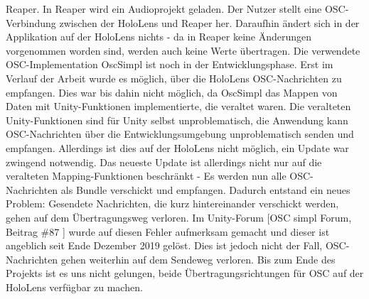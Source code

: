 \documentclass[11pt, titlepage, fleqn]{report}
\begin{document}
        	Reaper. In Reaper wird ein Audioprojekt geladen. Der Nutzer stellt 
        	eine OSC-Verbindung zwischen der HoloLens und Reaper her. Daraufhin 
        	ändert sich in der Applikation auf der HoloLens nichts - da in 
        	Reaper keine Änderungen vorgenommen worden sind, werden auch keine 
        	Werte übertragen.\newline
        	Die verwendete OSC-Implementation OscSimpl ist noch in der 
        	Entwicklungsphase. Erst im Verlauf der Arbeit wurde es möglich, 
        	über die HoloLens OSC-Nachrichten zu empfangen. Dies war bis dahin 
        	nicht möglich, da OscSimpl das Mappen von Daten mit 
        	Unity-Funktionen implementierte, die veraltet waren. Die veralteten 
        	Unity-Funktionen sind für Unity selbst unproblematisch, die 
        	Anwendung kann OSC-Nachrichten über die Entwicklungsumgebung 
        	unproblematisch senden und empfangen. Allerdings ist dies auf der 
        	HoloLens nicht möglich, ein Update war zwingend notwendig. Das 
        	neueste Update ist allerdings nicht nur auf die veralteten 
        	Mapping-Funktionen beschränkt - Es werden nun alle OSC-Nachrichten 
        	als Bundle verschickt und empfangen. Dadurch entstand ein neues 
        	Problem: Gesendete Nachrichten, die kurz hintereinander verschickt 
        	werden, gehen auf dem Übertragungsweg verloren. Im Unity-Forum 
        	[OSC simpl Forum, Beitrag \#87 \cite{OscSimpl87}] wurde auf diesen 
        	Fehler aufmerksam gemacht und 
        	dieser ist angeblich seit Ende Dezember 2019 gelöst. Dies ist jedoch 
        	nicht der Fall, OSC-Nachrichten gehen weiterhin auf dem Sendeweg 
        	verloren. Bis zum Ende des Projekts ist es uns nicht gelungen, 
        	beide Übertragungsrichtungen für OSC auf der HoloLens verfügbar zu 
        	machen.
        	
\end{document}
